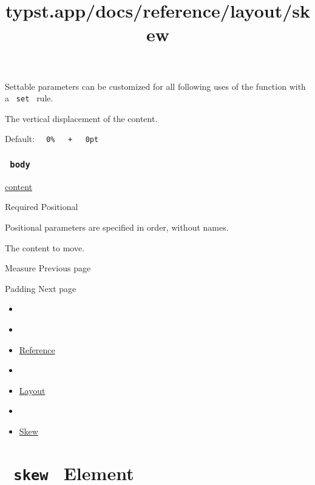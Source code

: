 \label{parameters-dy-settable-tooltip}
Settable parameters can be customized for all following uses of the
function with a \texttt{\ set\ } rule.

The vertical displacement of the content.

Default:
\texttt{\ }{\texttt{\ 0\%\ }}\texttt{\ }{\texttt{\ +\ }}\texttt{\ }{\texttt{\ 0pt\ }}\texttt{\ }

\subsubsection{\texorpdfstring{\texttt{\ body\ }}{ body }}\label{parameters-body}

\href{/docs/reference/foundations/content/}{content}

{Required} {{ Positional }}

\label{parameters-body-positional-tooltip}
Positional parameters are specified in order, without names.

The content to move.

\href{/docs/reference/layout/measure/}{\pandocbounded{}}

{ Measure } { Previous page }

\href{/docs/reference/layout/pad/}{\pandocbounded{}}

{ Padding } { Next page }


\title{typst.app/docs/reference/layout/skew}

\begin{itemize}
\tightlist
\item
  \href{/docs}{}
\item
  
\item
  \href{/docs/reference/}{Reference}
\item
  
\item
  \href{/docs/reference/layout/}{Layout}
\item
  
\item
  \href{/docs/reference/layout/skew/}{Skew}
\end{itemize}

\section{\texorpdfstring{\texttt{\ skew\ } {{ Element
}}}{ skew   Element }}\label{summary}

